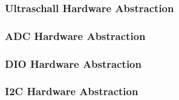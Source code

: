 \subsubsection{Ultraschall Hardware Abstraction}


\subsubsection{ADC Hardware Abstraction}

\subsubsection{DIO Hardware Abstraction}


\subsubsection{I2C Hardware Abstraction}

